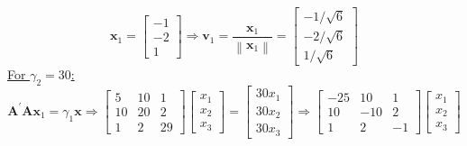 \begin{enumerate}[font=\bfseries]
\begin{enumerate}
            \[
                \mathbf{x}_1
                =
                \begin{bmatrix}
                    -1 \\
                    -2 \\
                    1
                \end{bmatrix}
                \Rightarrow
                \mathbf{v}_1
                =
                \frac{\mathbf{x}_1}{\left\|\mathbf{x}_1\right\|}
                =
                \begin{bmatrix}
                    -1/\sqrt{6} \\
                    -2/\sqrt{6} \\
                    1/\sqrt{6}
                \end{bmatrix}
            \]
            \underline{For $\gamma_2 = 30$:}
            \[
                \mathbf{A}^\prime\mathbf{A}\mathbf{x}_1 = \gamma_1\mathbf{x}
                \Rightarrow
                \begin{bmatrix}
                    5 & 10 & 1 \\
                    10 & 20 & 2 \\
                    1 & 2 & 29
                \end{bmatrix}
                \begin{bmatrix}
                    x_1 \\
                    x_2 \\
                    x_3
                \end{bmatrix}
                =
                \begin{bmatrix}
                    30 x_1\\
                    30 x_2 \\
                    30 x_3
                \end{bmatrix}
                \Rightarrow
                \begin{bmatrix}
                    -25 & 10 & 1 \\
                    10 & -10 & 2 \\
                    1 & 2 & -1
                \end{bmatrix}
                \begin{bmatrix}
                    x_1 \\
                    x_2 \\
                    x_3
                \end{bmatrix}
\]
\end{enumerate}
\end{enumerate}
